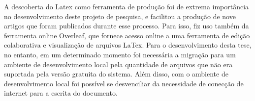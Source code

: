 A descoberta do Latex como ferramenta de produção foi de extrema importância no desenvolvimento deste projeto de pesquisa, e facilitou a produção de nove artigos que foram publicados durante esse processo. Para isso, fiz uso também da ferramenta online Overleaf, que fornece acesso online a uma ferramenta de edição colaborativa e visualização de arquivos LaTex. Para o desenvolvimento desta tese, no entanto, em um determinado momento foi necessária a migração para um ambiente de desenvolvimento local pela quantidade de arquivos que não era suportada pela versão gratuita do sistema. Além disso, com o ambiente de desenvolvimento local foi possível se desvenciliar da necessidade de conecção de internet para a escrita do documento.

\subsection{}




\subsubsection{ }




